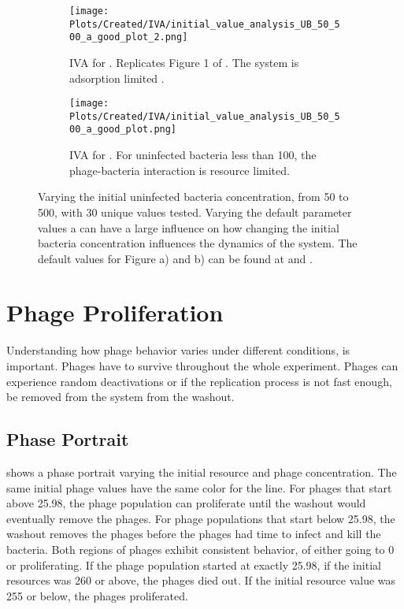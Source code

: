 \begin{figure}
    \centering
    \begin{subfigure}{1\linewidth}
        \centering
        \texttt{[image: Plots/Created/IVA/initial\_value\_analysis\_UB\_50\_500\_a\_good\_plot\_2.png]}
        \caption{
            IVA for . 
            Replicates Figure 1 of \citet{mullaExtremeDiversityPhage2024}. 
            The system is adsorption limited \cite{mullaExtremeDiversityPhage2024}. 
        }
        \label{fig:created:initial_value_analysis_UB_50_500_a_good_plot_2}
    \end{subfigure}
    \hfill
    \begin{subfigure}{1\linewidth}
        \centering
        \texttt{[image: Plots/Created/IVA/initial\_value\_analysis\_UB\_50\_500\_a\_good\_plot.png]}
        \caption{
            IVA for . 
            For uninfected bacteria less than 100, the phage-bacteria interaction is resource limited. 
        }
        \label{fig:created:initial_value_analysis_UB_50_500_a_good_plot}
    \end{subfigure}
    \caption{
        Varying the initial uninfected bacteria concentration, from 50 to 500, with 30 unique values tested. 
        Varying the default parameter values a can have a large influence on how changing the initial bacteria concentration influences the dynamics of the system. 
        The default values for Figure a) and b) can be found at  and . 
    }
\end{figure}

\section{Phage Proliferation}
Understanding how phage behavior varies under different conditions, is important. 
Phages have to survive throughout the whole experiment. 
Phages can experience random deactivations or if the replication process is not fast enough, be removed from the system from the washout. 
\label{sec:results:phase_portrait}
\subsection{Phase Portrait}
 shows a phase portrait varying the initial resource and phage concentration. 
The same initial phage values have the same color for the line. 
For phages that start above 25.98, the phage population can proliferate until the washout would eventually remove the phages. 
For phage populations that start below 25.98, the washout removes the phages before the phages had time to infect and kill the bacteria. 
Both regions of phages exhibit consistent behavior, of either going to 0 or proliferating. 
If the phage population started at exactly 25.98, if the initial resources was 260 or above, the phages died out. 
If the initial resource value was 255 or below, the phages proliferated. 

